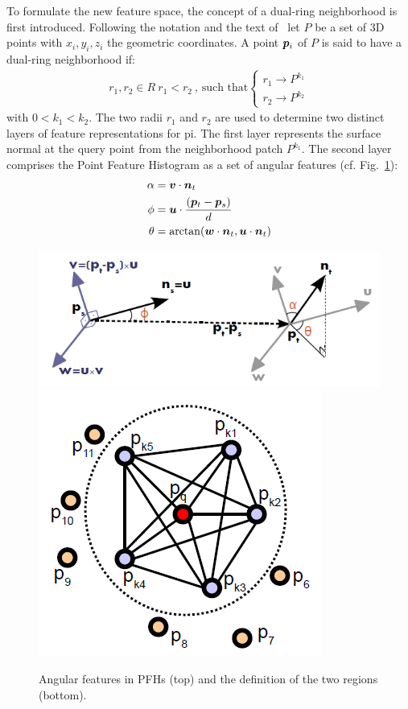 \documentclass[twocolumn,oneside]{book}
\newcommand{\V}[1]{\vector{#1}}  %
\begin{document}
\begin{itemize}
  To formulate the new feature space, the concept of a dual-ring
  neighborhood is first introduced.  Following the notation and the
  text of~\cite{RaduPhD} let $P$ be a set of 3D points with $x_i, y_i,
  z_i$ the geometric coordinates. A point $\V p_i$ of $P$ is said to
  have a dual-ring neighborhood if:
  \begin{align*}
  r_1, r_2 \in R \ r_1 < r_2 \
  \text{, such that}
  \left\{
  \begin{array}{l}
    r_1 \to P^{k_1}\\
    r_2 \to P^{k_2}
  \end{array}
  \right.
  \end{align*}
  with $0 < k_1 < k_2$. The two radii $r_1$ and $r_2$ are used to
  determine two distinct layers of feature representations for pi. The
  first layer represents the surface normal at the query point from
  the neighborhood patch $P^{k_1}$. The second layer comprises the
  Point Feature Histogram as a set of angular features
  (cf. Fig.~\ref{fig:angular_feature}):
  \begin{align*}
    \alpha & = \V v \cdot \V n_t \\
    \phi   & = \V u \cdot \frac{(\V p_t - \V p_s)}{d}\\
    \theta & = \arctan(\V w \cdot \V n_t, \V u \cdot \V n_t)
  \end{align*}
  \begin{figure}
    \centering
    \includegraphics[width=0.85\linewidth]{BOOKFIGS/angular_feature}
    \includegraphics[width=0.6\linewidth]{BOOKFIGS/pfh}
    \caption{Angular features in PFHs (top) and the definition of the
      two regions (bottom).}\label{fig:angular_feature}
  \end{figure}  


\end{itemize}
\end{document}
